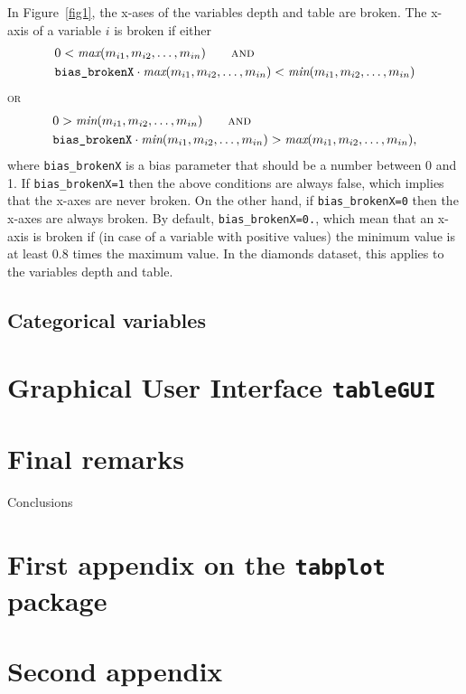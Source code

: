 \documentclass[11pt, fleqn, a4paper]{article}
\begin{document}
In Figure~\ref{fig1}, the x-ases of the variables depth and table are broken. The x-axis of a variable $i$ is broken if
either
\begin{align*}
& 0 < \textit{max}(m_{i1}, m_{i2},\ldots, m_{in}) \qquad \textsc{and}\\
& \mbox{{\tt bias\_brokenX}} \cdot \textit{max}(m_{i1}, m_{i2},\ldots, m_{in}) < \textit{min}(m_{i1}, m_{i2},\ldots, m_{in}) 
\end{align*}
\textsc{or}
\begin{align*}
& 0 > \textit{min}(m_{i1}, m_{i2},\ldots, m_{in}) \qquad \textsc{and}\\
& \mbox{{\tt bias\_brokenX}} \cdot \textit{min}(m_{i1}, m_{i2},\ldots, m_{in}) > \textit{max}(m_{i1}, m_{i2},\ldots, m_{in}),
\end{align*}
where {\tt bias\_brokenX} is a bias parameter that should be a number between 0 and 1. If {\tt bias\_brokenX=1} then the above conditions are always false, which implies that the x-axes are never broken. On the other hand, if {\tt bias\_brokenX=0} then the x-axes are always broken. By default, {\tt bias\_brokenX=0.}, which mean that an x-axis is broken if (in case of a variable with positive values) the minimum value is at least 0.8 times the maximum value. In the diamonds dataset, this applies to the variables depth and table.



\subsection{Categorical variables}




\section{Graphical User Interface {\tt tableGUI}}




\section{Final remarks}
Conclusions


%
%

\newpage
\appendix
\section{First appendix on the {\tt tabplot} package}
\section{Second appendix}
\end{document}
